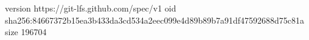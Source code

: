 version https://git-lfs.github.com/spec/v1
oid sha256:84667372b15ea3b433da3cd534a2eec099e4d89b89b7a91df47592688d75c81a
size 196704
